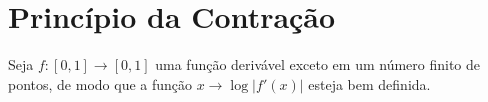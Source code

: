 \section{Princípio da Contração}

Seja $f: [0, 1] \to [0, 1]$ uma função derivável exceto em um número finito de pontos, de modo que a função $x \to \log|f'(x)|$ esteja bem definida.